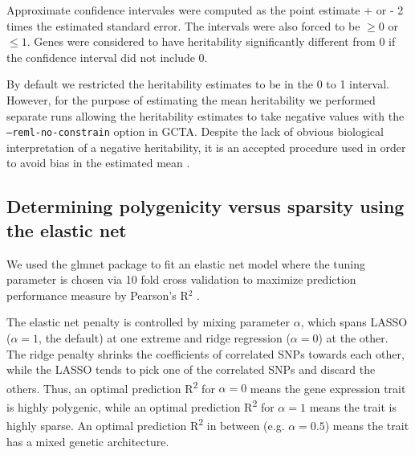 \documentclass[10pt,letterpaper]{article}
\begin{document}
Approximate confidence intervales were computed as the point estimate + or - 
2 times the estimated standard error. The intervals were also forced to be $\ge 0 $ or $\le 1$. 
Genes were considered to have heritability significantly different from 0 if the confidence interval did not include 0.

By default we restricted the heritability estimates to be in the 0 to 1 interval. However, 
for the purpose of estimating the mean heritability we performed separate runs allowing the heritability estimates to 
take negative values with the \texttt{--reml-no-constrain} option in GCTA. Despite the lack of obvious biological interpretation of a negative heritability, 
it is an accepted procedure used in order to avoid bias in the estimated mean \cite{Price_2011,Wright_2014}.


\subsection*{Determining polygenicity versus sparsity using the elastic
net}\label{determining-polygenicity-versus-sparsity-using-the-elastic-net}

We used the glmnet package to fit an elastic net model where the tuning parameter is chosen via 10 fold cross validation to maximize prediction performance measure by Pearson's R$^2$ \cite{Friedman_2010, Simon_2011}.


The elastic net penalty is controlled by mixing parameter \(\alpha\),
which spans LASSO (\(\alpha=1\), the default) \cite{Tibshirani_1996} at one extreme
and ridge regression (\(\alpha=0\)) \cite{Hoerl_1970} at the other. The ridge
penalty shrinks the coefficients of correlated SNPs towards each other,
while the LASSO tends to pick one of the correlated SNPs and discard the
others. Thus, an optimal prediction R\textsuperscript{2} for
\(\alpha=0\) means the gene expression trait is highly polygenic, while
an optimal prediction R\textsuperscript{2} for \(\alpha=1\) means the
trait is highly sparse. An optimal prediction R\textsuperscript{2} in
between (e.g. \(\alpha=0.5\)) means the trait has a mixed genetic
architecture.
\end{document}

